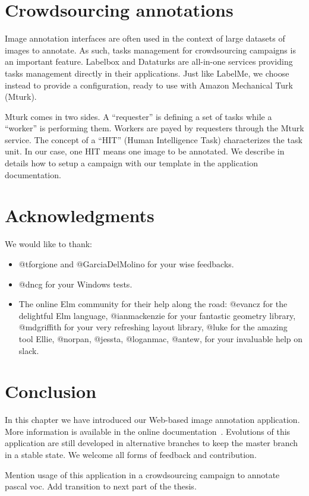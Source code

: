 \section{Crowdsourcing annotations}

Image annotation interfaces are often used in the context
of large datasets of images to annotate.
As such, tasks management for crowdsourcing campaigns is an important feature. 
Labelbox and Dataturks are all-in-one services providing
tasks management directly in their applications.
Just like LabelMe, we choose instead to provide a configuration,
ready to use with Amazon Mechanical Turk (Mturk).

Mturk comes in two sides. A ``requester'' is defining a set of tasks
while a ``worker'' is performing them.
Workers are payed by requesters through the Mturk service.
The concept of a ``HIT'' (Human Intelligence Task) characterizes the task unit.
In our case, one HIT means one image to be annotated.
We describe in details how to setup a campaign with our template
in the application documentation.


\section{Acknowledgments}

We would like to thank:

\begin{itemize}
	\item @tforgione and @GarciaDelMolino for your wise feedbacks.
	\item @dncg for your Windows tests.
	\item The online Elm community for their help along the road:
		@evancz for the delightful Elm language,
		@ianmackenzie for your fantastic geometry library,
		@mdgriffith for your very refreshing layout library,
		@luke for the amazing tool Ellie,
		@norpan, @jessta, @loganmac, @antew, for your invaluable help on slack.
\end{itemize}


\section{Conclusion}

In this chapter we have introduced our Web-based image annotation application.
More information is available in the online documentation~\cite{annotationappdoc}.
Evolutions of this application are still developed in alternative branches to keep
the master branch in a stable state. We welcome all forms of feedback and contribution.

\alert{Mention usage of this application in a crowdsourcing campaign
to annotate pascal voc. Add transition to next part of the thesis.}
